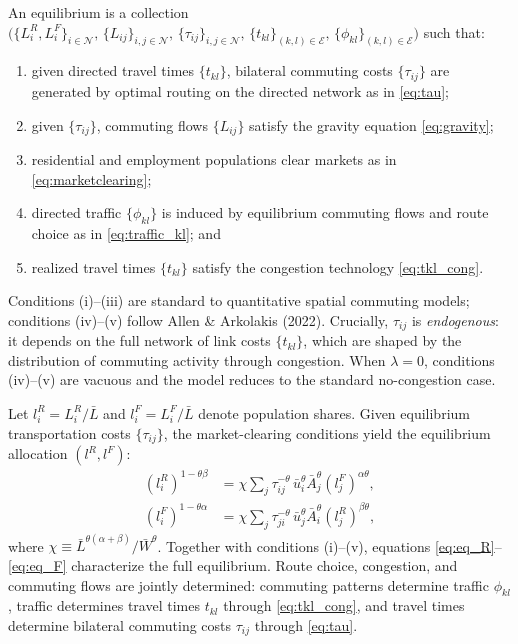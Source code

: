 \documentclass[12pt]{article}
\begin{document}
	An equilibrium is a collection
	$\bigl(\{L_i^R,L_i^F\}_{i\in\mathcal N},\,\{L_{ij}\}_{i,j\in\mathcal N},\,\{\tau_{ij}\}_{i,j\in\mathcal N},\,\{t_{kl}\}_{(k,l)\in\mathcal E},\,\{\phi_{kl}\}_{(k,l)\in\mathcal E}\bigr)$
	such that:
	\begin{enumerate}[label=(\roman*)]
		\item given directed travel times $\{t_{kl}\}$, bilateral commuting costs $\{\tau_{ij}\}$ are generated by optimal routing on the directed network as in \eqref{eq:tau};
		\item given $\{\tau_{ij}\}$, commuting flows $\{L_{ij}\}$ satisfy the gravity equation \eqref{eq:gravity};
		\item residential and employment populations clear markets as in \eqref{eq:marketclearing};
		\item directed traffic $\{\phi_{kl}\}$ is induced by equilibrium commuting flows and route choice as in \eqref{eq:traffic_kl}; and
		\item realized travel times $\{t_{kl}\}$ satisfy the congestion technology \eqref{eq:tkl_cong}.
	\end{enumerate}
	Conditions (i)--(iii) are standard to quantitative spatial commuting models; conditions (iv)--(v) follow Allen \& Arkolakis (2022). Crucially, $\tau_{ij}$ is \emph{endogenous}: it depends on the full network of link costs $\{t_{kl}\}$, which are shaped by the distribution of commuting activity through congestion. When $\lambda=0$, conditions (iv)--(v) are vacuous and the model reduces to the standard no-congestion case.

	Let $l_i^R=L_i^R/\bar L$ and $l_i^F=L_i^F/\bar L$ denote population shares. Given equilibrium transportation costs $\{\tau_{ij}\}$, the market-clearing conditions yield the equilibrium allocation $(l^R,l^F)$:
	\begin{align}
		(l_i^R)^{1-\theta\beta} &= \chi \sum_j \tau_{ij}^{-\theta}\,\bar u_i^\theta \bar A_j^\theta (l_j^F)^{\alpha\theta}, \label{eq:eq_R}\\
		(l_i^F)^{1-\theta\alpha} &= \chi \sum_j \tau_{ji}^{-\theta}\,\bar u_j^\theta \bar A_i^\theta (l_j^R)^{\beta\theta}, \label{eq:eq_F}
	\end{align}
	where $\chi\equiv \bar L^{\theta(\alpha+\beta)}/\bar W^{\theta}$. Together with conditions (i)--(v), equations \eqref{eq:eq_R}--\eqref{eq:eq_F} characterize the full equilibrium. Route choice, congestion, and commuting flows are jointly determined: commuting patterns determine traffic $\phi_{kl}$, traffic determines travel times $t_{kl}$ through \eqref{eq:tkl_cong}, and travel times determine bilateral commuting costs $\tau_{ij}$ through \eqref{eq:tau}.
\end{document}
